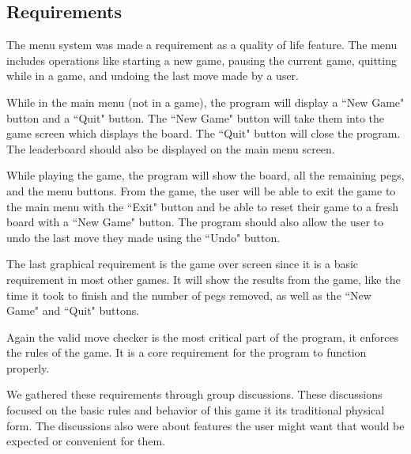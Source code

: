 \documentclass[10pt,conference,onecolumn,compsoc]{IEEEtran}
\begin{document}
\subsection{Requirements}
The menu system was made a requirement as a quality of life feature. The menu includes operations like starting a new game, pausing the current game, quitting while in a game, and undoing the last move made by a user.

While in the main menu (not in a game), the program will display a ``New Game" button and a ``Quit" button. The ``New Game" button will take them into the game screen which displays the board. The ``Quit" button will close the program. The leaderboard should also be displayed on the main menu screen. 

While playing the game, the program will show the board, all the remaining pegs, and the menu buttons. From the game, the user will be able to exit the game to the main menu with the ``Exit" button and be able to reset their game to a fresh board with a ``New Game" button. The program should also allow the user to undo the last move they made using the ``Undo" button.

The last graphical requirement is the game over screen since it is a basic requirement in most other games. It will show the results from the game, like the time it took to finish and the number of pegs removed, as well as the ``New Game" and ``Quit" buttons.

Again the valid move checker is the most critical part of the program, it enforces the rules of the game. It is a core requirement for the program to function properly.

We gathered these requirements through group discussions. These discussions focused on the basic rules and behavior of this game it its traditional physical form. The discussions also were about features the user might want that would be expected or convenient for them.
\end{document}
